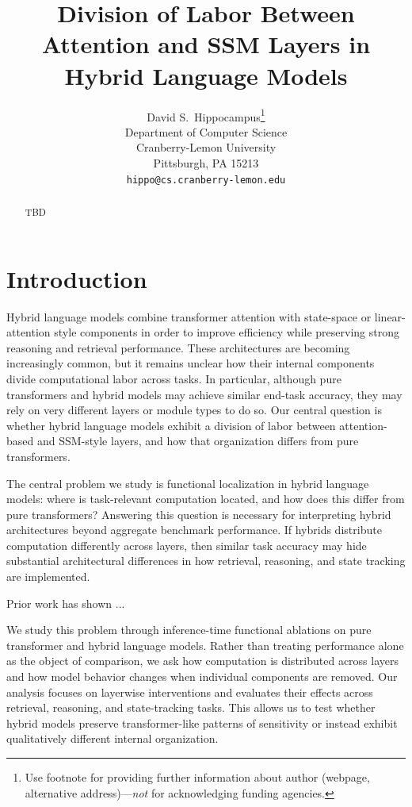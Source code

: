 \documentclass{article}
\title{Division of Labor Between Attention and SSM Layers in Hybrid Language Models}
\author{%
  David S.~Hippocampus\thanks{Use footnote for providing further information
    about author (webpage, alternative address)---\emph{not} for acknowledging
    funding agencies.} \\
  Department of Computer Science\\
  Cranberry-Lemon University\\
  Pittsburgh, PA 15213 \\
  \texttt{hippo@cs.cranberry-lemon.edu} \\
}
\begin{document}
\maketitle
    

\begin{abstract}
TBD
\end{abstract}



\section{Introduction}
\label{sec:intro}

Hybrid language models combine transformer attention with state-space or linear-attention style components in order to improve efficiency while preserving strong reasoning and retrieval performance.
These architectures are becoming increasingly common, but it remains unclear how their internal components divide computational labor across tasks. 
In particular, although pure transformers and hybrid models may achieve similar end-task accuracy, they may rely on very different layers or module types to do so. 
Our central question is whether hybrid language models exhibit a division of labor between attention-based and SSM-style layers, and how that organization differs from pure transformers.

The central problem we study is functional localization in hybrid language models: where is task-relevant computation located, and how does this differ from pure transformers? 
Answering this question is necessary for interpreting hybrid architectures beyond aggregate benchmark performance. 
If hybrids distribute computation differently across layers, 
then similar task accuracy may hide substantial architectural differences in how retrieval, reasoning, and state tracking are implemented.

Prior work has shown ...

We study this problem through inference-time functional ablations on pure transformer and hybrid language models. 
Rather than treating performance alone as the object of comparison, we ask how computation is distributed across layers and how model behavior changes when individual components are removed. 
Our analysis focuses on layerwise interventions and evaluates their effects across retrieval, reasoning, and state-tracking tasks. 
This allows us to test whether hybrid models preserve transformer-like patterns of sensitivity or instead exhibit qualitatively different internal organization.
\end{document}
